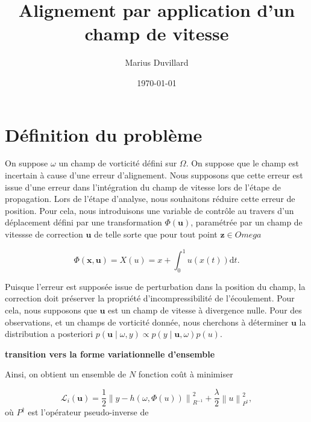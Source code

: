 \documentclass{article}
\newcommand{\norm}[1]{\left\lVert #1 \right\rVert}
\begin{document}
\title{Alignement par application d'un champ de vitesse}
\author{Marius Duvillard}
\date{\today}
\maketitle

\section{Définition du problème}

On suppose $\omega$ un champ de vorticité défini sur $\Omega$. On suppose que le champ est incertain à cause d'une erreur d'alignement.
Nous supposons que cette erreur est issue d'une erreur dans l'intégration du champ de vitesse lors de l'étape de propagation.
Lors de l'étape d'analyse, nous souhaitons réduire cette erreur de position. Pour cela, nous introduisons une variable de contrôle au travers d'un déplacement défini par une transformation $\Phi(\bm u)$, paramétrée par un champ de vitessse de correction $\bm u$ de telle sorte que pour tout point $\bm z \in Omega$

\begin{equation*}
    \Phi(\bm x, \bm u) = X(u) = x + \int_{0}^{1} u(x(t)) \mathrm dt.
\end{equation*}

Puisque l'erreur est supposée issue de perturbation dans la position du champ, la correction doit préserver la propriété d'incompressibilité de l'écoulement. Pour cela, nous supposons que $\bm u$ est un champ de vitesse à divergence nulle. Pour des observations, et un champs de vorticité donnée, nous cherchons à déterminer $\bm u$ la distribution a posteriori $p(\bm u \mid \omega, y) \propto p(y \mid \bm u, \omega) p(u)$.

\textbf{transition vers la forme variationnelle d'ensemble}

Ainsi, on obtient un ensemble de $N$ fonction coût à minimiser

\begin{equation*}
    \mathcal L_i (\bm u) = \frac{1}{2}\norm{y - h(\omega, \Phi(u))}^2_{R^{-1}} + \frac \lambda 2 \norm{u}^2_{P^{\dag}},
\end{equation*}où $P^{\dag}$ est l'opérateur pseudo-inverse de
\end{document}
